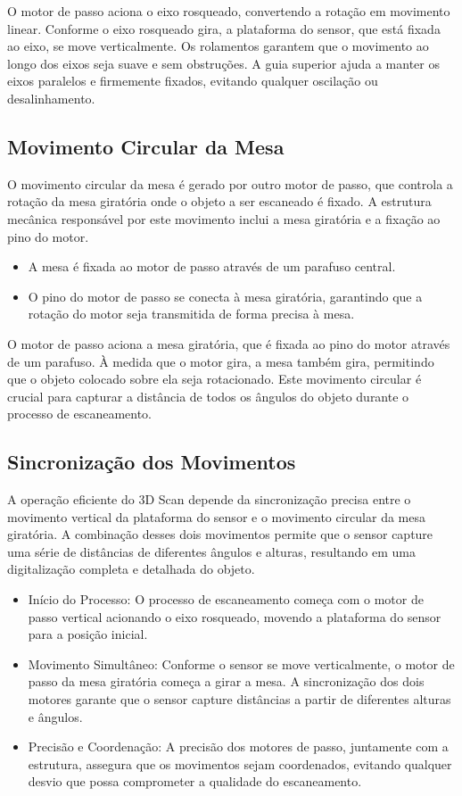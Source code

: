 O motor de passo aciona o eixo rosqueado, convertendo a rotação em movimento linear. Conforme o eixo rosqueado gira, a plataforma do sensor, que está fixada ao eixo, se move verticalmente. Os rolamentos garantem que o movimento ao longo dos eixos seja suave e sem obstruções. A guia superior ajuda a manter os eixos paralelos e firmemente fixados, evitando qualquer oscilação ou desalinhamento.

\subsection{Movimento Circular da Mesa}

O movimento circular da mesa é gerado por outro motor de passo, que controla a rotação da mesa giratória onde o objeto a ser escaneado é fixado. A estrutura mecânica responsável por este movimento inclui a mesa giratória e a fixação ao pino do motor.

\begin{itemize}
    \item A mesa é fixada ao motor de passo através de um parafuso central.
    \item O pino do motor de passo se conecta à mesa giratória, garantindo que a rotação do motor seja transmitida de forma precisa à mesa.
\end{itemize}

O motor de passo aciona a mesa giratória, que é fixada ao pino do motor através de um parafuso. À medida que o motor gira, a mesa também gira, permitindo que o objeto colocado sobre ela seja rotacionado. Este movimento circular é crucial para capturar a distância de todos os ângulos do objeto durante o processo de escaneamento.

\subsection{Sincronização dos Movimentos}

A operação eficiente do 3D Scan depende da sincronização precisa entre o movimento vertical da plataforma do sensor e o movimento circular da mesa giratória. A combinação desses dois movimentos permite que o sensor capture uma série de distâncias de diferentes ângulos e alturas, resultando em uma digitalização completa e detalhada do objeto.

\begin{itemize}
    \item Início do Processo: O processo de escaneamento começa com o motor de passo vertical acionando o eixo rosqueado, movendo a plataforma do sensor para a posição inicial.
    \item Movimento Simultâneo: Conforme o sensor se move verticalmente, o motor de passo da mesa giratória começa a girar a mesa. A sincronização dos dois motores garante que o sensor capture distâncias a partir de diferentes alturas e ângulos.
    \item Precisão e Coordenação: A precisão dos motores de passo, juntamente com a estrutura, assegura que os movimentos sejam coordenados, evitando qualquer desvio que possa comprometer a qualidade do escaneamento.
\end{itemize}
